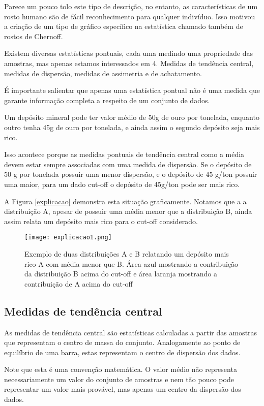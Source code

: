 Parece um pouco tolo este tipo de descrição, no entanto, as características de um rosto humano são de fácil reconhecimento para qualquer indivíduo. Isso motivou a criação de um tipo de gráfico específico na estatística chamado também de rostos de Chernoff. 

Existem diversas estatísticas pontuais, cada uma medindo uma propriedade das amostras, mas apenas estamos interessados em 4. Medidas de tendência central, medidas de dispersão, medidas de assimetria e de achatamento.

É importante salientar que apenas uma estatística pontual não é uma medida que garante informação completa a respeito de um conjunto de dados.

 Um depósito mineral pode ter valor médio de 50g de ouro por tonelada, enquanto outro tenha 45g de ouro por tonelada, e ainda assim o segundo depósito seja mais rico. 
 
 Isso acontece porque as medidas pontuais de tendência central como a média devem estar sempre associadas com uma medida de dispersão. Se o depósito de 50 g por tonelada possuir uma menor dispersão, e o depósito de 45 g/ton possuir uma maior, para um dado cut-off o depósito de 45g/ton pode ser mais rico.

A Figura \eqref{explicacao} demonstra esta situação graficamente. Notamos que a a distribuição A, apesar de possuir uma média menor que a distribuição B, ainda assim relata um depósito mais rico para o cut-off considerado. 

\begin{figure}[H]
	\texttt{[image: explicacao1.png]}	
	\caption{Exemplo de duas distribuições A e B relatando um depósito mais rico A com média menor que B. Área azul mostrando a contribuição da distribuição B acima do cut-off e área laranja mostrando a contribuição de A acima do cut-off}
	\label{explicacao}
\end{figure}

\subsection{Medidas de tendência central} 

As medidas de tendência central são estatísticas calculadas a partir das amostras que representam o centro de massa do conjunto. Analogamente ao ponto de equilíbrio de uma barra, estas representam o centro de dispersão dos dados. 

Note que esta é uma convenção matemática. O valor médio não representa necessariamente um valor do conjunto de amostras e nem tão pouco pode representar um valor mais provável, mas apenas um centro da dispersão dos dados.

